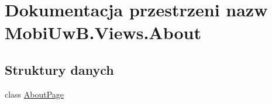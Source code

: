 \hypertarget{a00276}{}\section{Dokumentacja przestrzeni nazw Mobi\+Uw\+B.\+Views.\+About}
\label{a00276}
\subsection*{Struktury danych}
\begin{DoxyCompactItemize}
\item 
class \hyperlink{a00003}{About\+Page}
\end{DoxyCompactItemize}
